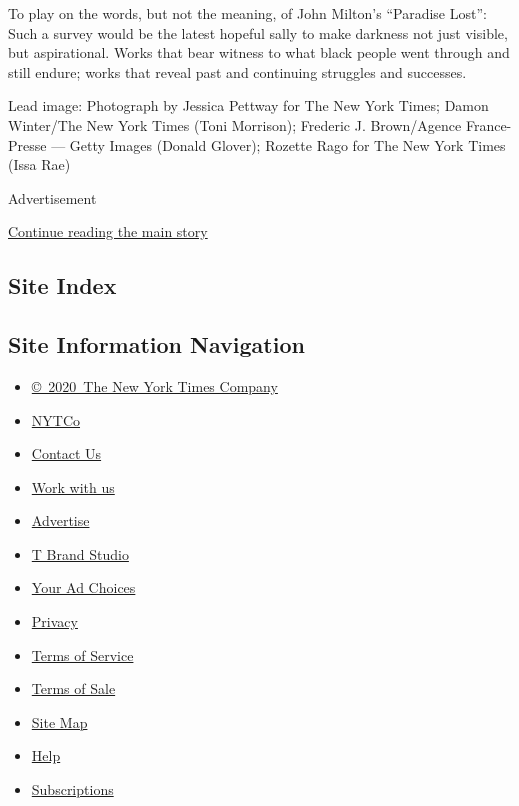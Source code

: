 To play on the words, but not the meaning, of John Milton's ``Paradise
Lost'': Such a survey would be the latest hopeful sally to make darkness
not just visible, but aspirational. Works that bear witness to what
black people went through and still endure; works that reveal past and
continuing struggles and successes.

Lead image: Photograph by Jessica Pettway for The New York Times; Damon
Winter/The New York Times (Toni Morrison); Frederic J. Brown/Agence
France-Presse --- Getty Images (Donald Glover); Rozette Rago for The New
York Times (Issa Rae)

Advertisement

\protect\hyperlink{after-bottom}{Continue reading the main story}

\hypertarget{site-index}{%
\subsection{Site Index}\label{site-index}}

\hypertarget{site-information-navigation}{%
\subsection{Site Information
Navigation}\label{site-information-navigation}}

\begin{itemize}
\tightlist
\item
  \href{https://help.nytimes3xbfgragh.onion/hc/en-us/articles/115014792127-Copyright-notice}{©~2020~The
  New York Times Company}
\end{itemize}

\begin{itemize}
\tightlist
\item
  \href{https://www.nytco.com/}{NYTCo}
\item
  \href{https://help.nytimes3xbfgragh.onion/hc/en-us/articles/115015385887-Contact-Us}{Contact
  Us}
\item
  \href{https://www.nytco.com/careers/}{Work with us}
\item
  \href{https://nytmediakit.com/}{Advertise}
\item
  \href{http://www.tbrandstudio.com/}{T Brand Studio}
\item
  \href{https://www.nytimes3xbfgragh.onion/privacy/cookie-policy\#how-do-i-manage-trackers}{Your
  Ad Choices}
\item
  \href{https://www.nytimes3xbfgragh.onion/privacy}{Privacy}
\item
  \href{https://help.nytimes3xbfgragh.onion/hc/en-us/articles/115014893428-Terms-of-service}{Terms
  of Service}
\item
  \href{https://help.nytimes3xbfgragh.onion/hc/en-us/articles/115014893968-Terms-of-sale}{Terms
  of Sale}
\item
  \href{https://spiderbites.nytimes3xbfgragh.onion}{Site Map}
\item
  \href{https://help.nytimes3xbfgragh.onion/hc/en-us}{Help}
\item
  \href{https://www.nytimes3xbfgragh.onion/subscription?campaignId=37WXW}{Subscriptions}
\end{itemize}
